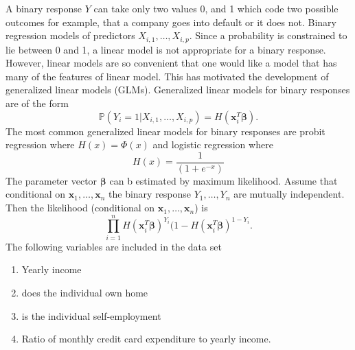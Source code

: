 \documentclass{book}
\begin{document}
A binary response $Y$ can take only two values 0, and 1 which code two possible outcomes for example, that a company goes into default or it does not. Binary regression models of predictors $X_{i,1},\dots,X_{i,p}.$ Since a probability is constrained to lie between 0 and 1, a linear model is not appropriate for a binary response. However, linear models are so convenient that one would like a model that has many of the features of linear model. This has motivated the development of generalized linear models (GLMs). Generalized linear models for binary responses are of the form
$$
\mathbb{P}(Y_{i}=1|X_{i,1},\dots,X_{i,p})=H(\mathbf{x}_{i}^{T}\pmb{\beta}).
$$
The most common generalized linear models for binary responses are probit regression  where $H(x)=\Phi(x)$ and logistic regression where
$$
H(x)=\frac{1}{(1+e^{-x})}
$$ 
The parameter vector $\pmb{\beta}$ can b estimated by maximum likelihood. Assume that conditional on $\mathbf{x}_{1},\dots,\mathbf{x}_{n}$ the binary response $Y_{1},\dots,Y_{n}$ are mutually independent. Then the likelihood (conditional on $\mathbf{x}_{1},\dots,\mathbf{x}_{n}$) is
$$
\prod_{i=1}^{n}H(\mathbf{x}_{i}^{T}\pmb{\beta})^{Y_{i}}(1-H(\mathbf{x}_{i}^{T}\pmb{\beta})^{1-Y_{i}}.
$$
The following variables are included in the data set
\begin{enumerate}
\item Yearly income
\item does the individual own home
\item is the individual self-employment
\item Ratio of monthly credit card expenditure to yearly income.
\end{enumerate}
\end{document}
